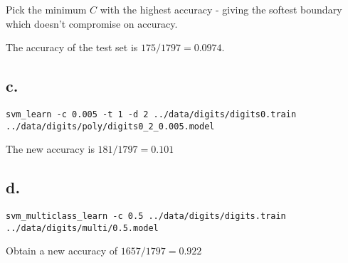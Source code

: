\documentclass[]{article}
\begin{document}
Pick the minimum $C$ with the highest accuracy - giving the softest boundary which doesn't compromise on accuracy.

The accuracy of the test set is $175/1797 = 0.0974$.

\subsection*{c.}
\begin{verbatim}
svm_learn -c 0.005 -t 1 -d 2 ../data/digits/digits0.train ../data/digits/poly/digits0_2_0.005.model
\end{verbatim}
The new accuracy is $181/1797 = 0.101$

\subsection*{d.}
\begin{verbatim}
svm_multiclass_learn -c 0.5 ../data/digits/digits.train ../data/digits/multi/0.5.model
\end{verbatim}

Obtain a new accuracy of $1657/1797 = 0.922$
\end{document}
